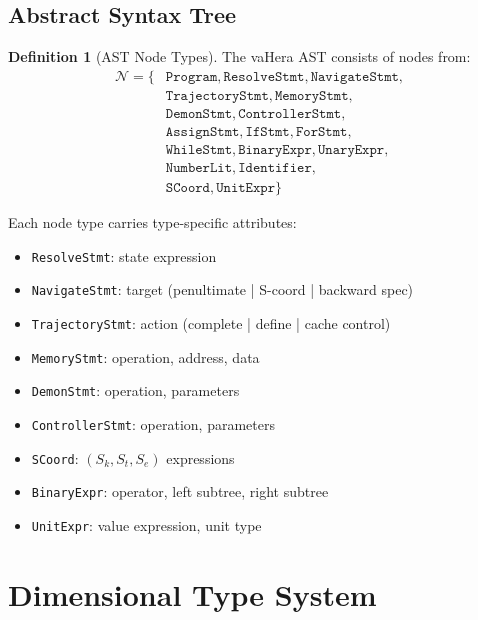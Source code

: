 \documentclass[twocolumn,10pt]{article}
\theoremstyle{definition}
\newtheorem{definition}[theorem]{Definition}
\theoremstyle{remark}
\begin{document}
\subsection{Abstract Syntax Tree}

\begin{definition}[AST Node Types]
The vaHera AST consists of nodes from:
\begin{align*}
    \mathcal{N} = \{&\texttt{Program}, \texttt{ResolveStmt}, \texttt{NavigateStmt}, \\
                    &\texttt{TrajectoryStmt}, \texttt{MemoryStmt}, \\
                    &\texttt{DemonStmt}, \texttt{ControllerStmt}, \\
                    &\texttt{AssignStmt}, \texttt{IfStmt}, \texttt{ForStmt}, \\
                    &\texttt{WhileStmt}, \texttt{BinaryExpr}, \texttt{UnaryExpr}, \\
                    &\texttt{NumberLit}, \texttt{Identifier}, \\
                    &\texttt{SCoord}, \texttt{UnitExpr}\}
\end{align*}
\end{definition}

Each node type carries type-specific attributes:
\begin{itemize}
    \item \texttt{ResolveStmt}: state expression
    \item \texttt{NavigateStmt}: target (penultimate | S-coord | backward spec)
    \item \texttt{TrajectoryStmt}: action (complete | define | cache control)
    \item \texttt{MemoryStmt}: operation, address, data
    \item \texttt{DemonStmt}: operation, parameters
    \item \texttt{ControllerStmt}: operation, parameters
    \item \texttt{SCoord}: $(S_k, S_t, S_e)$ expressions
    \item \texttt{BinaryExpr}: operator, left subtree, right subtree
    \item \texttt{UnitExpr}: value expression, unit type
\end{itemize}

\section{Dimensional Type System}
\label{sec:types}
\end{document}
